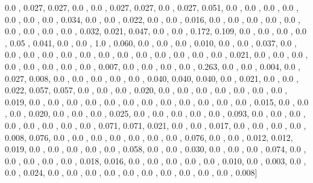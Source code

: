 \documentclass[usenames,dvipsnames]{article} %
\begin{document}
0.0  , 0.027, 0.027, 0.0  , 0.0  , 0.027, 0.027, 0.0  , 0.027, 0.051, 0.0  , 0.0  , 0.0  , 0.0  , 0.0  , 0.0  , 0.0  , 0.034, 0.0  , 0.0  , 0.022, 0.0  , 0.0  , 0.016, 0.0  , 0.0  , 0.0  , 0.0  , 0.0  , 0.0  , 0.0  , 0.0  , 0.0  , 0.032, 0.021, 0.047, 0.0  , 0.0  , 0.172, 0.109, 0.0  , 0.0  , 0.0  , 0.0  , 0.05 , 0.041, 0.0  , 0.0  , 1.0  , 0.060, 0.0  , 0.0  , 0.0  , 0.010, 0.0  , 0.0  , 0.037, 0.0  , 0.0  , 0.0  , 0.0  , 0.0  , 0.0  , 0.0  , 0.0  , 0.0  , 0.0  , 0.0  , 0.0  , 0.0  , 0.021, 0.0  , 0.0  , 0.0  , 0.0  , 0.0  , 0.0  , 0.0  , 0.0  , 0.007, 0.0  , 0.0  , 0.0  , 0.0  , 0.263, 0.0  , 0.0  , 0.004, 0.0  , 0.027, 0.008, 0.0  , 0.0  , 0.0  , 0.0  , 0.0  , 0.040, 0.040, 0.040, 0.0  , 0.021, 0.0  , 0.0  , 0.022, 0.057, 0.057, 0.0  , 0.0  , 0.0  , 0.020, 0.0  , 0.0  , 0.0  , 0.0  , 0.0  , 0.0  , 0.0  , 0.019, 0.0  , 0.0  , 0.0  , 0.0  , 0.0  , 0.0  , 0.0  , 0.0  , 0.0  , 0.0  , 0.0  , 0.0  , 0.015, 0.0  , 0.0  , 0.0  , 0.020, 0.0  , 0.0  , 0.0  , 0.025, 0.0  , 0.0  , 0.0  , 0.0  , 0.0  , 0.093, 0.0  , 0.0  , 0.0  , 0.0  , 0.0  , 0.0  , 0.0  , 0.0  , 0.071, 0.071, 0.021, 0.0  , 0.0  , 0.017, 0.0  , 0.0  , 0.0  , 0.0  , 0.008, 0.076, 0.0  , 0.0  , 0.0  , 0.0  , 0.0  , 0.0  , 0.0  , 0.076, 0.0  , 0.0  , 0.012, 0.012, 0.019, 0.0  , 0.0  , 0.0  , 0.0  , 0.0  , 0.058, 0.0  , 0.0  , 0.030, 0.0  , 0.0  , 0.0  , 0.074, 0.0  , 0.0  , 0.0  , 0.0  , 0.0  , 0.018, 0.016, 0.0  , 0.0  , 0.0  , 0.0  , 0.0  , 0.010, 0.0  , 0.003, 0.0  , 0.0  , 0.024, 0.0  , 0.0  , 0.0  , 0.0  , 0.0  , 0.0  , 0.0  , 0.0  , 0.0  , 0.0  , 0.008]
\end{document}
